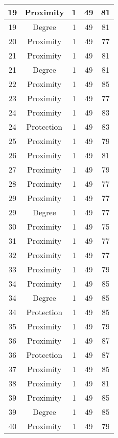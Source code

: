 \documentclass[results.tex]{subfiles}
\begin{document}
\begin{center}
\begin{tabular}{| c || c | c | c | c |}
    \hline
    19 & Proximity & 1 & 49 & 81 \\ 
    \hline
    19 & Degree & 1 & 49 & 81 \\ 
    \hline
    20 & Proximity & 1 & 49 & 77 \\ 
    \hline
    21 & Proximity & 1 & 49 & 81 \\ 
    \hline
    21 & Degree & 1 & 49 & 81 \\ 
    \hline
    22 & Proximity & 1 & 49 & 85 \\ 
    \hline
    23 & Proximity & 1 & 49 & 77 \\ 
    \hline
    24 & Proximity & 1 & 49 & 83 \\ 
    \hline
    24 & Protection & 1 & 49 & 83 \\ 
    \hline
    25 & Proximity & 1 & 49 & 79 \\ 
    \hline
    26 & Proximity & 1 & 49 & 81 \\ 
    \hline
    27 & Proximity & 1 & 49 & 79 \\ 
    \hline
    28 & Proximity & 1 & 49 & 77 \\ 
    \hline
    29 & Proximity & 1 & 49 & 77 \\ 
    \hline
    29 & Degree & 1 & 49 & 77 \\ 
    \hline
    30 & Proximity & 1 & 49 & 75 \\ 
    \hline
    31 & Proximity & 1 & 49 & 77 \\ 
    \hline
    32 & Proximity & 1 & 49 & 77 \\ 
    \hline
    33 & Proximity & 1 & 49 & 79 \\ 
    \hline
    34 & Proximity & 1 & 49 & 85 \\ 
    \hline
    34 & Degree & 1 & 49 & 85 \\ 
    \hline
    34 & Protection & 1 & 49 & 85 \\ 
    \hline
    35 & Proximity & 1 & 49 & 79 \\ 
    \hline
    36 & Proximity & 1 & 49 & 87 \\ 
    \hline
    36 & Protection & 1 & 49 & 87 \\ 
    \hline
    37 & Proximity & 1 & 49 & 85 \\ 
    \hline
    38 & Proximity & 1 & 49 & 81 \\ 
    \hline
    39 & Proximity & 1 & 49 & 85 \\ 
    \hline
    39 & Degree & 1 & 49 & 85 \\ 
    \hline
    40 & Proximity & 1 & 49 & 79 \\ 

\end{tabular}
\end{center}
\end{document}
